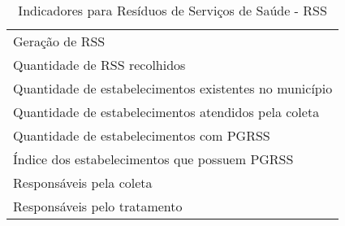 \begin{table}[h!]
  \centering
  \caption{Indicadores para Resíduos de Serviços de Saúde - RSS}
    \begin{tabular}{|p{25em}|}
    \rowcolor[rgb]{ .984,  .831,  .706} \multicolumn{1}{P{25em}}{RESÍDUOS DE SERVIÇO DE SAÚDE} \\
    \midrule
    Geração de RSS \\
    \midrule
    Quantidade de RSS recolhidos \\
    \midrule
    Quantidade de estabelecimentos existentes no município \\
    \midrule
    Quantidade de estabelecimentos atendidos pela coleta \\
    \midrule
    Quantidade de estabelecimentos com PGRSS \\
    \midrule
    Índice dos estabelecimentos que possuem PGRSS \\
    \midrule
    Responsáveis pela coleta \\
    \midrule
    Responsáveis pelo tratamento \\
    \bottomrule
    \end{tabular}%
  \label{tab:ind_rss}%
\end{table}%
